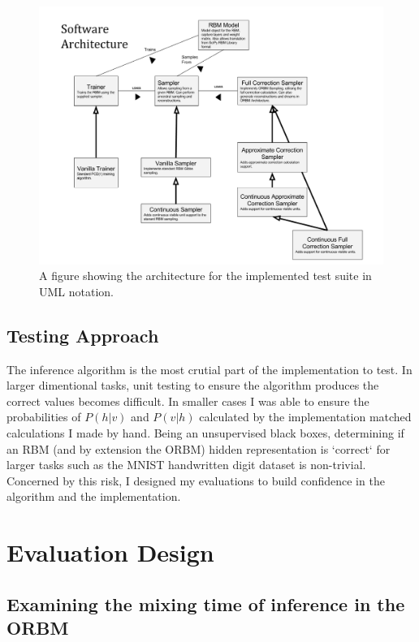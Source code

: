 \begin{figure}[h]
\begin{center}
  \includegraphics[width = 1\textwidth]{Assets/ENGR489-Architecture.png}
\caption{A figure showing the architecture for the implemented test suite in UML notation.}
\label{F:Prog-Arch}
\end{center}
\end{figure}

\subsection{Testing Approach}

The inference algorithm is the most crutial part of the implementation to test. In larger dimentional tasks, unit testing to ensure the algorithm produces the correct values becomes difficult. In smaller cases I was able to ensure the probabilities of $P(h|v)$ and $P(v|h)$ calculated by the implementation matched calculations I made by hand. Being an unsupervised black boxes, determining if an RBM (and by extension the ORBM) hidden representation is `correct` for larger tasks such as the MNIST handwritten digit dataset is non-trivial. Concerned by this risk, I designed my evaluations to build confidence in the algorithm and the implementation.

\section{Evaluation Design}
\subsection{Examining the mixing time of inference in the ORBM}


